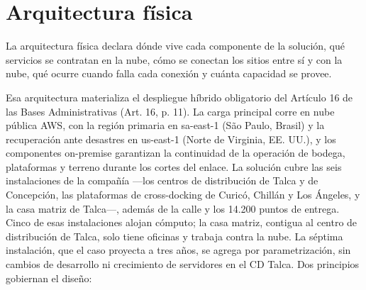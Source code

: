 %
%

\ifdefined\LFXcuerpotablaorig\else
  \let\LFXcuerpotablaorig\LFXcuerpotabla
  \renewcommand{\LFXcuerpotabla}{%
    \LFXcuerpotablaorig\hyphenpenalty=10000\exhyphenpenalty=10000\relax}
\fi

\chapter{Arquitectura física}
\label{cap:4-2-arquitectura-fisica}

La arquitectura física declara dónde vive cada componente de la solución, qué servicios se contratan en la nube, cómo se conectan los sitios entre sí y con la nube, qué ocurre cuando falla cada conexión y cuánta capacidad se provee.

Esa arquitectura materializa el despliegue híbrido obligatorio del Artículo 16\textdegree{} de las Bases Administrativas (Art. 16, p. 11). La carga principal corre en nube pública AWS, con la región primaria en sa-east-1 (São Paulo, Brasil) y la recuperación ante desastres en us-east-1 (Norte de Virginia, EE. UU.), y los componentes on-premise garantizan la continuidad de la operación de bodega, plataformas y terreno durante los cortes del enlace. La solución cubre las seis instalaciones de la compañía ---los centros de distribución de Talca y de Concepción, las plataformas de cross-docking de Curicó, Chillán y Los Ángeles, y la casa matriz de Talca---, además de la calle y los 14.200 puntos de entrega. Cinco de esas instalaciones alojan cómputo; la casa matriz, contigua al centro de distribución de Talca, solo tiene oficinas y trabaja contra la nube. La séptima instalación, que el caso proyecta a tres años, se agrega por parametrización, sin cambios de desarrollo ni crecimiento de servidores en el CD Talca. Dos principios gobiernan el diseño:

